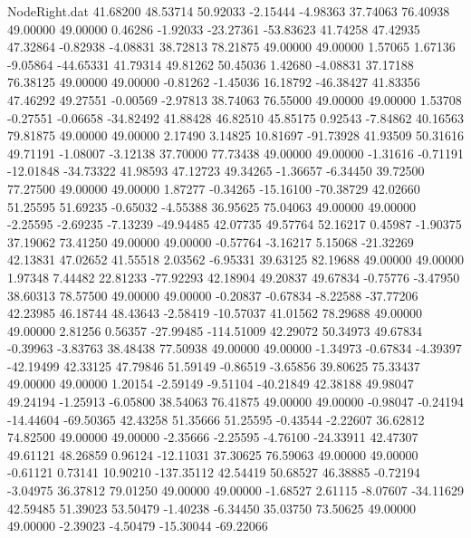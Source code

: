 \begin{filecontents}{NodeRight.dat}
  41.68200   48.53714   50.92033    -2.15444   -4.98363   37.74063   76.40938   49.00000   49.00000    0.46286   -1.92033  -23.27361  -53.83623
  41.74258   47.42935   47.32864    -0.82938   -4.08831   38.72813   78.21875   49.00000   49.00000    1.57065    1.67136   -9.05864  -44.65331
  41.79314   49.81262   50.45036     1.42680   -4.08831   37.17188   76.38125   49.00000   49.00000   -0.81262   -1.45036   16.18792  -46.38427
  41.83356   47.46292   49.27551    -0.00569   -2.97813   38.74063   76.55000   49.00000   49.00000    1.53708   -0.27551   -0.06658  -34.82492
  41.88428   46.82510   45.85175     0.92543   -7.84862   40.16563   79.81875   49.00000   49.00000    2.17490    3.14825   10.81697  -91.73928
  41.93509   50.31616   49.71191    -1.08007   -3.12138   37.70000   77.73438   49.00000   49.00000   -1.31616   -0.71191  -12.01848  -34.73322
  41.98593   47.12723   49.34265    -1.36657   -6.34450   39.72500   77.27500   49.00000   49.00000    1.87277   -0.34265  -15.16100  -70.38729
  42.02660   51.25595   51.69235    -0.65032   -4.55388   36.95625   75.04063   49.00000   49.00000   -2.25595   -2.69235   -7.13239  -49.94485
  42.07735   49.57764   52.16217     0.45987   -1.90375   37.19062   73.41250   49.00000   49.00000   -0.57764   -3.16217    5.15068  -21.32269
  42.13831   47.02652   41.55518     2.03562   -6.95331   39.63125   82.19688   49.00000   49.00000    1.97348    7.44482   22.81233  -77.92293
  42.18904   49.20837   49.67834    -0.75776   -3.47950   38.60313   78.57500   49.00000   49.00000   -0.20837   -0.67834   -8.22588  -37.77206
  42.23985   46.18744   48.43643    -2.58419  -10.57037   41.01562   78.29688   49.00000   49.00000    2.81256    0.56357  -27.99485 -114.51009
  42.29072   50.34973   49.67834    -0.39963   -3.83763   38.48438   77.50938   49.00000   49.00000   -1.34973   -0.67834   -4.39397  -42.19499
  42.33125   47.79846   51.59149    -0.86519   -3.65856   39.80625   75.33437   49.00000   49.00000    1.20154   -2.59149   -9.51104  -40.21849
  42.38188   49.98047   49.24194    -1.25913   -6.05800   38.54063   76.41875   49.00000   49.00000   -0.98047   -0.24194  -14.44604  -69.50365
  42.43258   51.35666   51.25595    -0.43544   -2.22607   36.62812   74.82500   49.00000   49.00000   -2.35666   -2.25595   -4.76100  -24.33911
  42.47307   49.61121   48.26859     0.96124  -12.11031   37.30625   76.59063   49.00000   49.00000   -0.61121    0.73141   10.90210 -137.35112
  42.54419   50.68527   46.38885    -0.72194   -3.04975   36.37812   79.01250   49.00000   49.00000   -1.68527    2.61115   -8.07607  -34.11629
  42.59485   51.39023   53.50479    -1.40238   -6.34450   35.03750   73.50625   49.00000   49.00000   -2.39023   -4.50479  -15.30044  -69.22066

\end{filecontents}
